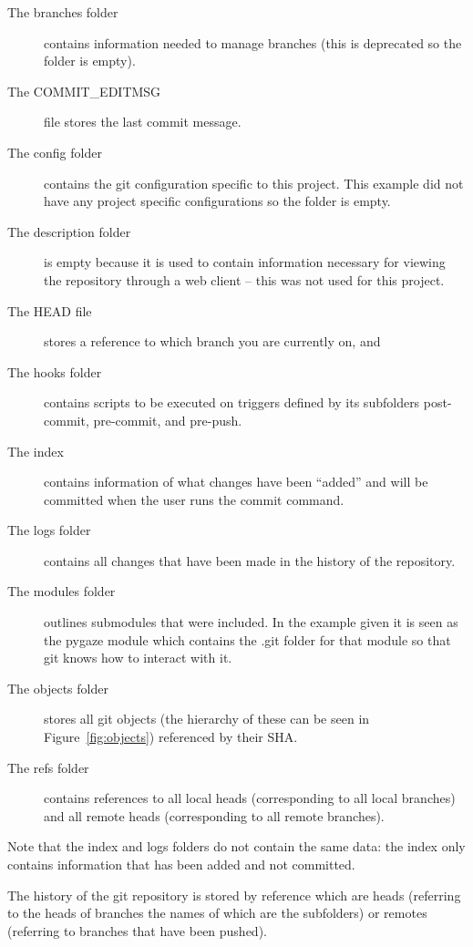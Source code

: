 \documentclass[12pt]{article}
\begin{document}
\begin{description}
\item[The branches folder] contains information needed to manage branches (this is deprecated so the folder is empty).
\item[The COMMIT\_EDITMSG] file stores the last commit message.
\item[The config folder] contains the git configuration specific to this project. This example did not have any project specific configurations so the folder is empty.
\item[The description folder] is empty because it is used to contain information necessary for viewing the repository through a web client -- this was not used for this project.
\item[The HEAD file] stores a reference to which branch you are currently on, and
\item[The hooks folder] contains scripts to be executed on triggers defined by its subfolders post-commit, pre-commit, and pre-push.
\item[The index] contains information of what changes have been ``added'' and will be committed when the user runs the commit command.
\item[The logs folder] contains all changes that have been made in the history of the repository.
\item[The modules folder] outlines submodules that were included. In the example given it is seen as the pygaze module which contains the .git folder for that module so that git knows how to interact with it.
\item[The objects folder] stores all git objects (the hierarchy of these can be seen in Figure~\ref{fig:objects}) referenced by their SHA.
\item[The refs folder] contains references to all local heads (corresponding to all local branches) and all remote heads (corresponding to all remote branches).
\end{description}

Note that the index and logs folders do not contain the same data: the index only contains information that has been added and not committed.

The history of the git repository is stored by reference which are heads (referring to the heads of branches the names of which are the subfolders) or remotes (referring to branches that have been pushed).
\end{document}
